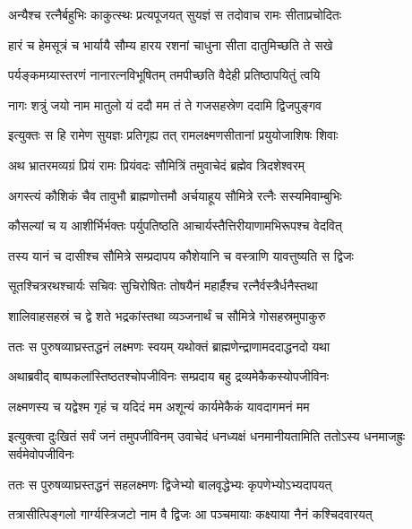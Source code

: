 \twolineshloka
{अन्यैश्च रत्नैर्बहुभिः काकुत्स्थः प्रत्यपूजयत्}
{सुयज्ञं स तदोवाच रामः सीताप्रचोदितः} %

\twolineshloka
{हारं च हेमसूत्रं च भार्यायै सौम्य हारय}
{रशनां चाधुना सीता दातुमिच्छति ते सखे} %

\twolineshloka
{पर्यङ्कमग्र्यास्तरणं नानारत्नविभूषितम्}
{तमपीच्छति वैदेही प्रतिष्ठापयितुं त्वयि} %

\twolineshloka
{नागः शत्रुं जयो नाम मातुलो यं ददौ मम}
{तं ते गजसहस्रेण ददामि द्विजपुङ्गव} %

\twolineshloka
{इत्युक्तः स हि रामेण सुयज्ञः प्रतिगृह्य तत्}
{रामलक्ष्मणसीतानां प्रयुयोजाशिषः शिवाः} %

\twolineshloka
{अथ भ्रातरमव्यग्रं प्रियं रामः प्रियंवदः}
{सौमित्रिं तमुवाचेदं ब्रह्मेव त्रिदशेश्वरम्} %

\twolineshloka
{अगस्त्यं कौशिकं चैव तावुभौ ब्राह्मणोत्तमौ}
{अर्चयाहूय सौमित्रे रत्नैः सस्यमिवाम्बुभिः} %

\twolineshloka
{कौसल्यां च य आशीर्भिर्भक्तः पर्युपतिष्ठति}
{आचार्यस्तैत्तिरीयाणामभिरूपश्च वेदवित्} %

\twolineshloka
{तस्य यानं च दासीश्च सौमित्रे सम्प्रदापय}
{कौशेयानि च वस्त्राणि यावत्तुष्यति स द्विजः} %

\twolineshloka
{सूतश्चित्ररथश्चार्यः सचिवः सुचिरोषितः}
{तोषयैनं महार्हैश्च रत्नैर्वस्त्रैर्धनैस्तथा} %

\twolineshloka
{शालिवाहसहस्रं च द्वे शते भद्रकांस्तथा}
{व्यञ्जनार्थं च सौमित्रे गोसहस्रमुपाकुरु} %

\twolineshloka
{ततः स पुरुषव्याघ्रस्तद्धनं लक्ष्मणः स्वयम्}
{यथोक्तं ब्राह्मणेन्द्राणामददाद्धनदो यथा} %

\twolineshloka
{अथाब्रवीद् बाष्पकलांस्तिष्ठतश्चोपजीविनः}
{सम्प्रदाय बहु द्रव्यमेकैकस्योपजीविनः} %

\twolineshloka
{लक्ष्मणस्य च यद्वेश्म गृहं च यदिदं मम}
{अशून्यं कार्यमेकैकं यावदागमनं मम} %

\threelineshloka
{इत्युक्त्वा दुःखितं सर्वं जनं तमुपजीविनम्}
{उवाचेदं धनध्यक्षं धनमानीयतामिति}
{ततोऽस्य धनमाजह्रुः सर्वमेवोपजीविनः} %

\twolineshloka
{ततः स पुरुषव्याघ्रस्तद्धनं सहलक्ष्मणः}
{द्विजेभ्यो बालवृद्धेभ्यः कृपणेभ्योऽभ्यदापयत्} %

\twolineshloka
{तत्रासीत्पिङ्गलो गार्ग्यस्त्रिजटो नाम वै द्विजः}
{आ पञ्चमायाः कक्ष्याया नैनं कश्चिदवारयत्} %

